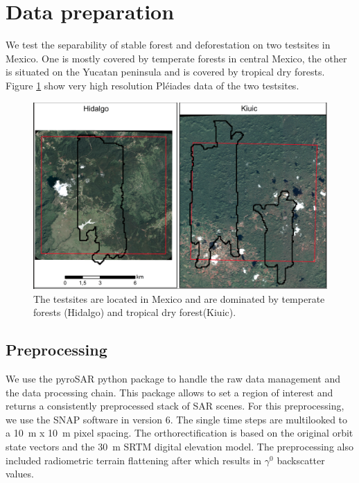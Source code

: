 \documentclass{article}
\begin{document}
\section{Data preparation}
We test the separability of stable forest and deforestation on two testsites in Mexico.
One is mostly covered by temperate forests in central Mexico,
the other is situated on the Yucatan peninsula and is covered by tropical dry forests.
Figure \ref{testsites} show very high resolution Pléiades data of the two testsites.

\begin{figure}
  \includegraphics[width=\textwidth]{figs/SEN4REDD_testsites.png}
  \caption{The testsites are located in Mexico and are dominated by temperate forests (Hidalgo) and tropical dry forest(Kiuic).}
  \label{testsites}
\end{figure}

\subsection{Preprocessing}

We use the pyroSAR python package \cite{pyroSAR} to handle the raw data management and the data processing chain.
This package allows to set a region of interest and returns  a consistently preprocessed stack of SAR scenes.
For this preprocessing, we use the SNAP software \cite{SNAP} in version 6.
The single time steps are multilooked to a \SI{10}{\m} x \SI{10}{\m} pixel spacing.
The orthorectification is based on the original orbit state vectors and the \SI{30}{\m} SRTM digital elevation model\cite{SRTM}.
The preprocessing also included radiometric terrain flattening after \cite{Small} which results in $\gamma^0$ backscatter values.
\end{document}
